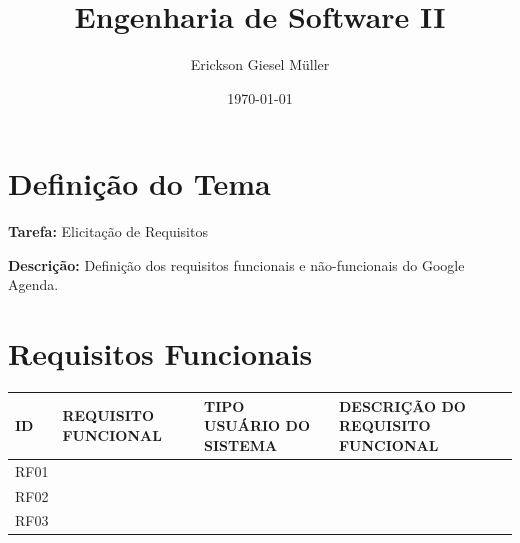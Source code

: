\documentclass[12pt,a4paper]{article}
\title{Engenharia de Software II}
\author{Erickson Giesel Müller}
\date{\today}
\begin{document}
\maketitle

\section*{Definição do Tema}
\textbf{Tarefa:} Elicitação de Requisitos

\textbf{Descrição:} Definição dos requisitos funcionais e não-funcionais do Google Agenda.


\section{Requisitos Funcionais}
\begin{table}[h]
    \centering
    \renewcommand{\arraystretch}{1.5} %
    \begin{tabularx}{\textwidth}{|l|X|X|X|}
        \hline
        \textbf{ID} & \textbf{REQUISITO FUNCIONAL} & \textbf{TIPO USUÁRIO DO SISTEMA} & \textbf{DESCRIÇÃO DO REQUISITO FUNCIONAL} \\ \hline
        RF01        &                               &                                  &                                           \\ \hline
        RF02        &                               &                                  &                                           \\ \hline
        RF03        &                               &                                  &                                           \\ \hline
    \end{tabularx}
\end{table}
\end{document}

